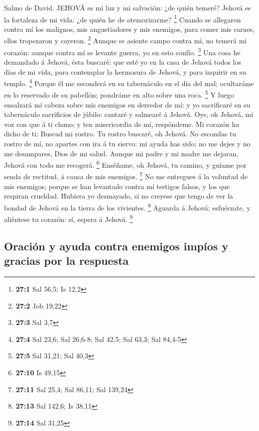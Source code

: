  Salmo de David. JEHOVÁ es mi luz y mi salvación: ¿de quién
temeré? Jehová es la fortaleza de mi vida: ¿de quién he de atemorizarme?
\footnote{\textbf{27:1} Sal 56,5; Is 12,2}  Cuando se
allegaron contra mí los malignos, mis angustiadores y mis enemigos, para
comer mis carnes, ellos tropezaron y cayeron. \footnote{\textbf{27:2}
  Job 19,22}  Aunque se asiente campo contra mí, no temerá
mi corazón: aunque contra mí se levante guerra, yo en esto confío.
\footnote{\textbf{27:3} Sal 3,7}  Una cosa he demandado á
Jehová, ésta buscaré: que esté yo en la casa de Jehová todos los días de
mi vida, para contemplar la hermosura de Jehová, y para inquirir en su
templo. \footnote{\textbf{27:4} Sal 23,6; Sal 26,6-8; Sal 42,5; Sal
  63,3; Sal 84,4-5}  Porque él me esconderá en su
tabernáculo en el día del mal; ocultaráme en lo reservado de su
pabellón; pondráme en alto sobre una roca. \footnote{\textbf{27:5} Sal
  31,21; Sal 40,3}  Y luego ensalzará mi cabeza sobre mis
enemigos en derredor de mí: y yo sacrificaré en su tabernáculo
sacrificios de júbilo: cantaré y salmearé á Jehová.  Oye, oh
Jehová, mi voz con que á ti clamo; y ten misericordia de mí, respóndeme.
 Mi corazón ha dicho de ti: Buscad mi rostro. Tu rostro
buscaré, oh Jehová.  No escondas tu rostro de mí, no apartes
con ira á tu siervo: mi ayuda has sido; no me dejes y no me desampares,
Dios de mi salud.  Aunque mi padre y mi madre me dejaran,
Jehová con todo me recogerá. \footnote{\textbf{27:10} Is 49,15}
 Enséñame, oh Jehová, tu camino, y guíame por senda de
rectitud, á causa de mis enemigos. \footnote{\textbf{27:11} Sal 25,4;
  Sal 86,11; Sal 139,24}  No me entregues á la voluntad de
mis enemigos; porque se han levantado contra mí testigos falsos, y los
que respiran crueldad.  Hubiera yo desmayado, si no creyese
que tengo de ver la bondad de Jehová en la tierra de los vivientes.
\footnote{\textbf{27:13} Sal 142,6; Is 38,11}  Aguarda á
Jehová; esfuérzate, y aliéntese tu corazón: sí, espera á Jehová.
\footnote{\textbf{27:14} Sal 31,25}

\hypertarget{oraciuxf3n-y-ayuda-contra-enemigos-impuxedos-y-gracias-por-la-respuesta}{%
\subsection{Oración y ayuda contra enemigos impíos y gracias por la
respuesta}\label{oraciuxf3n-y-ayuda-contra-enemigos-impuxedos-y-gracias-por-la-respuesta}}

